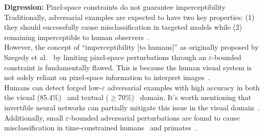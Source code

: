 \documentclass[a4paper, oneside]{discothesis}
\begin{document}
\begin{highlightbox}
	\textbf{Digression:} Pixel-space constraints do not guarantee imperceptibility \\

	Traditionally, adversarial examples are expected to have two key properties: (1) they should successfully cause misclassification in targeted models while (2) remaining imperceptible to human observers~\cite{cubuk2017intriguing}. \\

	However, the concept of ``imperceptibility [to humans]'' as originally proposed by Szegedy et al.~\cite{szegedy2013intriguing} by limiting pixel-space perturbations through an $\varepsilon$-bounded constraint is fundamentally flawed. This is because the human visual system is not solely reliant on pixel-space information to interpret images~\cite{mentzer2020high, ning2023hflic}. \\

	Humans can detect forged low-$\varepsilon$ adversarial examples with high accuracy in both the visual (85.4\%)~\cite{veerabadran2023subtle} and textual ($\geq$70\%)~\cite{herel2023preserving} domain. It's worth mentioning that invertible neural networks can partially mitigate this issue in the visual domain~\cite{chen2023imperceptible}. \\
	
	Additionally, small $\varepsilon$-bounded adversarial perturbations are found to cause misclassification in time-constrained humans~\cite{elsayed2018adversarial} and primates~\cite{yuan2020fooling}.
\end{highlightbox}
\end{document}
